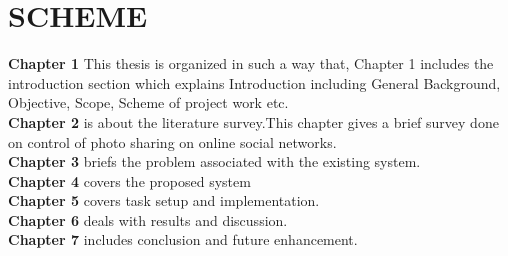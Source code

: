 \section[Scheme]{\fontsize{14}{12}\selectfont SCHEME}
\textbf{Chapter 1} This thesis is organized in such a way that, Chapter 1 includes the introduction section which explains Introduction including General Background, Objective, Scope, Scheme of project work etc.\\
\textbf{Chapter 2} is about the literature survey.This chapter gives a brief survey done on control of photo sharing on online social networks.\\
\textbf{Chapter 3} briefs the problem associated with the existing system.\\
\textbf{Chapter 4} covers the proposed system \\
\textbf{Chapter 5} covers task setup and implementation.\\
\textbf{Chapter 6} deals with results and discussion.\\
\textbf{Chapter 7} includes conclusion and future enhancement.\\

